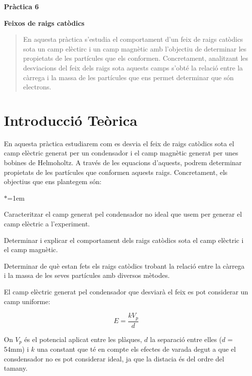 \documentclass[11pt]{article}
\begin{document}
\tableofcontents
\newpage
\vspace{10em}

{\huge \textbf{Pràctica 6}}  %

\vspace{0.5em}  %

{\Huge \textbf{Feixos de raigs catòdics}}  %

\begin{abstract}
     En aquesta pràctica s'estudia el comportament d'un feix de raigs catòdics sota un camp elèctirc i un camp magnètic amb l'objectiu de determinar les propietats de les partícules que els conformen. Concretament, analitzant les desviacions del feix dels raigs sota aquests camps s'obté la relació entre la càrrega i la massa de les partícules que ens permet determinar que són electrons.
\end{abstract}

\section{Introducció Teòrica}
En aquesta pràctica estudiarem com es desvia el feix de raigs catòdics sota el camp elèctric generat per un condensador i el camp magnètic generat per unes bobines de Helmoholtz. A través de les equacions d'aquests, podrem determinar propietats de les partícules que conformen aquests raigs. Concretament, els objectius que ens plantegem són:

\begin{list}{$\ast$}{\leftmargin=1em}
    \item Caracteritzar el camp generat pel condensador no ideal que usem per generar el camp elèctric a l'experiment.
    \item Determinar i explicar el comportament dels raigs catòdics sota el camp elèctric i el camp magnètic.
    \item Determinar de què estan fets els raigs catòdics trobant la relació entre la càrrega i la massa de les seves partícules amb diversos mètodes.
\end{list}

El camp elèctric generat pel condensador que desviarà el feix es pot considerar un camp uniforme:

\begin{equation}
    E = \frac{kV_p}{d}
    \label{eq: Camp E}
\end{equation}

On $V_p$ és el potencial aplicat entre les plàques, $d$ la separació entre elles ($d$ = 54mm) i $k$ una constant que té en compte els efectes de varada degut a que el consdensador no es pot considerar ideal, ja que la distacia és del ordre del tamany.
\end{document}
